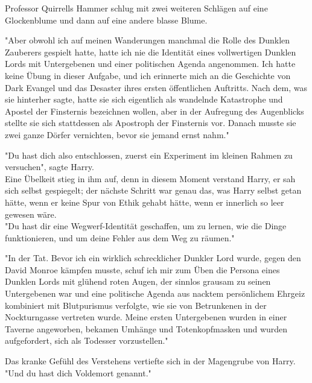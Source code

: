 {Professor Quirrells Hammer schlug mit zwei weiteren Schlägen auf eine Glockenblume und dann auf eine andere blasse Blume.

"Aber obwohl ich auf meinen Wanderungen manchmal die Rolle des Dunklen Zauberers gespielt hatte, hatte ich nie die Identität eines vollwertigen Dunklen Lords mit Untergebenen und einer politischen Agenda angenommen. Ich hatte keine Übung in dieser Aufgabe, und ich erinnerte mich an die Geschichte von Dark Evangel und das Desaster ihres ersten öffentlichen Auftritts. Nach dem, was sie hinterher sagte, hatte sie sich eigentlich als wandelnde Katastrophe und Apostel der Finsternis bezeichnen wollen, aber in der Aufregung des Augenblicks stellte sie sich stattdessen als Apostroph der Finsternis vor. Danach musste sie zwei ganze Dörfer vernichten, bevor sie jemand ernst nahm."

"Du hast dich also entschlossen, zuerst ein Experiment im kleinen Rahmen zu versuchen", sagte Harry.\\ Eine Übelkeit stieg in ihm auf, denn in diesem Moment verstand Harry, er sah sich selbst gespiegelt; der nächste Schritt war genau das, was Harry selbst getan hätte, wenn er keine Spur von Ethik gehabt hätte, wenn er innerlich so leer gewesen wäre.\\ "Du hast dir eine Wegwerf-Identität geschaffen, um zu lernen, wie die Dinge funktionieren, und um deine Fehler aus dem Weg zu räumen."

"In der Tat. Bevor ich ein wirklich schrecklicher Dunkler Lord wurde, gegen den David Monroe kämpfen musste, schuf ich mir zum Üben die Persona eines Dunklen Lords mit glühend roten Augen, der sinnlos grausam zu seinen Untergebenen war und eine politische Agenda aus nacktem persönlichem Ehrgeiz kombiniert mit Blutpurismus verfolgte, wie sie von Betrunkenen in der Nockturngasse vertreten wurde. Meine ersten Untergebenen wurden in einer Taverne angeworben, bekamen Umhänge und Totenkopfmasken und wurden aufgefordert, sich als Todesser vorzustellen."

Das kranke Gefühl des Verstehens vertiefte sich in der Magengrube von Harry.\\ "Und du hast dich Voldemort genannt."

}

